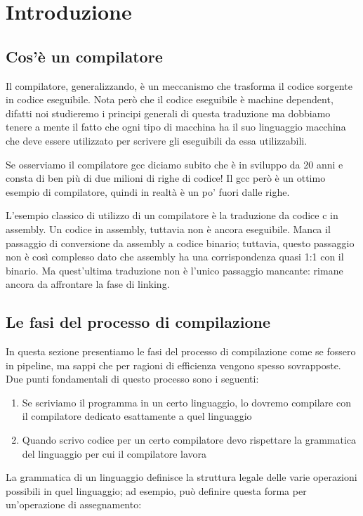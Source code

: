 \documentclass[class=book, crop=false, oneside]{standalone}
\begin{document}
\chapter{Introduzione}

\section{Cos'è un compilatore}
Il compilatore, generalizzando, è un meccanismo che trasforma il codice sorgente in codice eseguibile.
Nota però che il codice eseguibile è machine dependent, difatti noi studieremo i principi generali di questa traduzione ma dobbiamo tenere a mente il fatto che ogni tipo di macchina ha il suo linguaggio macchina che deve essere utilizzato per scrivere gli eseguibili da essa utilizzabili.


Se osserviamo il compilatore gcc diciamo subito che è in sviluppo da 20 anni e consta di ben più di due milioni di righe di codice! Il gcc però è un ottimo esempio di compilatore, quindi in realtà è un po’ fuori dalle righe.


L’esempio classico di utilizzo di un compilatore è la traduzione da codice c in assembly.
Un codice in assembly, tuttavia non è ancora eseguibile. Manca il passaggio di conversione da assembly a codice binario; tuttavia, questo passaggio non è così complesso dato che assembly ha una corrispondenza quasi 1:1 con il binario.
Ma quest’ultima traduzione non è l’unico passaggio mancante: rimane ancora da affrontare la fase di linking.

\section{Le fasi del processo di compilazione}
In questa sezione presentiamo le fasi del processo di compilazione come se fossero in pipeline, ma sappi che per ragioni di efficienza vengono spesso sovrapposte. Due punti fondamentali di questo processo sono i seguenti:
\begin{enumerate}
    \item Se scriviamo il programma in un certo linguaggio, lo dovremo compilare con il compilatore dedicato esattamente a quel linguaggio
    \item Quando scrivo codice per un certo compilatore devo rispettare la grammatica del linguaggio per cui il compilatore lavora
\end{enumerate}
La grammatica di un linguaggio definisce la struttura legale delle varie operazioni possibili in quel linguaggio; ad esempio, può definire questa forma per un’operazione di assegnamento:
\end{document}
